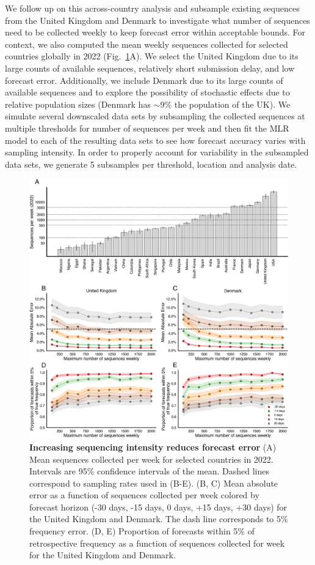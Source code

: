 We follow up on this across-country analysis and subsample existing sequences from the United Kingdom and Denmark to investigate what number of sequences need to be collected weekly to keep forecast error within acceptable bounds.
For context, we also computed the mean weekly sequences collected for selected countries globally in 2022 (Fig.~\ref{fig:Fig6}A).
We select the United Kingdom due to its large counts of available sequences, relatively short submission delay, and low forecast error.
Additionally, we include Denmark due to its large counts of available sequences and to explore the possibility of stochastic effects due to relative population sizes (Denmark has $\sim$9\% the population of the UK).
We simulate several downscaled data sets by subsampling the collected sequences at multiple thresholds for number of sequences per week and then fit the MLR model to each of the resulting data sets to see how forecast accuracy varies with sampling intensity.
In order to properly account for variability in the subsampled data sets, we generate 5 subsamples per threshold, location and analysis date.


\begin{figure}[tb!]
    \centering
    \includegraphics[width=1.0\linewidth]{figures/downscaling_sequencing.png}
    \caption{
	\textbf{Increasing sequencing intensity reduces forecast error}
    	(A) Mean sequences collected per week for selected countries in 2022.
			Intervals are 95\% confidence intervals of the mean.
			Dashed lines correspond to sampling rates used in (B-E).
    	(B, C) Mean absolute error as a function of sequences collected per week colored by forecast horizon (-30 days, -15 days, 0 days, +15 days, +30 days) for the United Kingdom and Denmark.
			The dash line corresponds to 5\% frequency error.
    	(D, E) Proportion of forecasts within 5\% of retrospective frequency as a function of sequences collected for week for the United Kingdom and Denmark.
  	}
    \label{fig:Fig6}
\end{figure}


